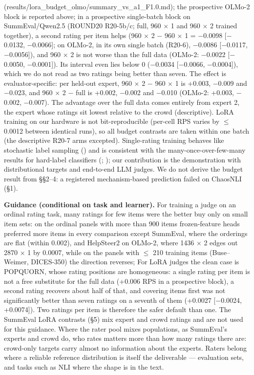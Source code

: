 \documentclass[10pt]{article}
\begin{document}
(results/lora\_budget\_olmo/summary\_vs\_a1\_F1.0.md); the prospective OLMo-2 block is reported above; in a prospective single-batch block on SummEval/Qwen2.5 (ROUND20 R20-5b/c; full, 960 $\times$ 1 and 960 $\times$ 2 trained together), a second rating per item helps (960 $\times$ 2 $-$ 960 $\times$ 1 = $-$0.0098 {[}$-$0.0132, $-$0.0066{]}; on OLMo-2, in its own single batch (R20-6), $-$0.0086 {[}$-$0.0117, $-$0.0056{]}), and 960 $\times$ 2 is not worse than the full data (OLMo-2: $-$0.0022 {[}$-$0.0050, $-$0.0001{]}). Its interval even lies below 0 ($-$0.0034 {[}$-$0.0066, $-$0.0004{]}), which we do not read as two ratings being better than seven. The effect is evaluator-specific: per held-out expert, 960 $\times$ 2 $-$ 960 $\times$ 1 is +0.003, $-$0.009 and $-$0.023, and 960 $\times$ 2 $-$ full is +0.002, $-$0.002 and $-$0.010 (OLMo-2: +0.003, $-$0.002, $-$0.007). The advantage over the full data comes entirely from expert 2, the expert whose ratings sit lowest relative to the crowd (descriptive). LoRA training on our hardware is not bit-reproducible (per-cell RPS varies by $\leq$ 0.0012 between identical runs), so all budget contrasts are taken within one batch (the descriptive R20-7 arms excepted). Single-rating training behaves like stochastic label sampling (\citealp{gheibi2026same}) and is consistent with the many-once-over-few-many results for hard-label classifiers (\citealp{khetan2018learning}; \citealp{lin2014relabel}); our contribution is the demonstration with distributional targets and end-to-end LLM judges. We do not derive the budget result from \S{}\S{}2--4: a registered mechanism-based prediction failed on ChaosNLI (\S{}1).

\textbf{Guidance (conditional on task and learner).} For training a judge on an ordinal rating task, many ratings for few items were the better buy only on small item sets: on the ordinal panels with more than 900 items frozen-feature heads preferred more items in every comparison except SummEval, where the orderings are flat (within 0.002), and HelpSteer2 on OLMo-2, where 1436 $\times$ 2 edges out 2870 $\times$ 1 by 0.0007, while on the panels with $\leq$ 210 training items (Buse--Weimer, DICES-350) the direction reverses; For LoRA judges the clean case is POPQUORN, whose rating positions are homogeneous: a single rating per item is not a free substitute for the full data (+0.006 RPS in a prospective block), a second rating recovers about half of that, and covering items first was not significantly better than seven ratings on a seventh of them (+0.0027 {[}$-$0.0024, +0.0074{]}). Two ratings per item is therefore the safer default than one. The SummEval LoRA contrasts (\S{}5) mix expert and crowd ratings and are not used for this guidance. Where the rater pool mixes populations, as SummEval's experts and crowd do, who rates matters more than how many ratings there are: crowd-only targets carry almost no information about the experts. Raters belong where a reliable reference distribution is itself the deliverable --- evaluation sets, and tasks such as NLI where the shape is in the text.
\end{document}
